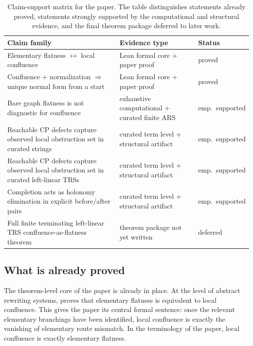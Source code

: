 \documentclass[11pt]{article}
\numberwithin{equation}{section}
\theoremstyle{definition}
\theoremstyle{remark}
\begin{document}
\begin{table}[t]
    \caption{Claim-support matrix for the paper. The table distinguishes statements already proved, statements strongly supported by the computational and structural evidence, and the final theorem package deferred to later work.}
    \label{tab:claim-support-matrix}
    \centering
    \smallskip
    \small
\setlength{\tabcolsep}{5pt}
\renewcommand{\arraystretch}{1.15}
\begin{tabularx}{\linewidth}{@{}Y Y l@{}}
\toprule
Claim family & Evidence type & Status \\
\midrule
Elementary flatness $\leftrightarrow$ local confluence & Lean formal core + paper proof & proved \\[3pt]
Confluence + normalization $\Rightarrow$ unique normal form from a start & Lean formal core + paper proof & proved \\[3pt]
Bare graph flatness is not diagnostic for confluence & exhaustive computational + curated finite ARS & emp.\ supported \\[3pt]
Reachable CP defects capture observed local obstruction set in curated strings & curated term level + structural artifact & emp.\ supported \\[3pt]
Reachable CP defects capture observed local obstruction set in curated left-linear TRSs & curated term level + structural artifact & emp.\ supported \\[3pt]
Completion acts as holonomy elimination in explicit before/after pairs & curated term level + structural artifact & emp.\ supported \\[3pt]
Full finite terminating left-linear TRS confluence-as-flatness theorem & theorem package not yet written & deferred \\
\bottomrule
\end{tabularx}
 \end{table}

\subsection{What is already proved}
\label{subsec:what-is-proved}

The theorem-level core of the paper is already in place. At the level of abstract rewriting systems,  proves that elementary flatness is equivalent to local confluence. This gives the paper its central formal sentence: once the relevant elementary branchings have been identified, local confluence is exactly the vanishing of elementary route mismatch. In the terminology of the paper, local confluence is exactly elementary flatness.
\end{document}

